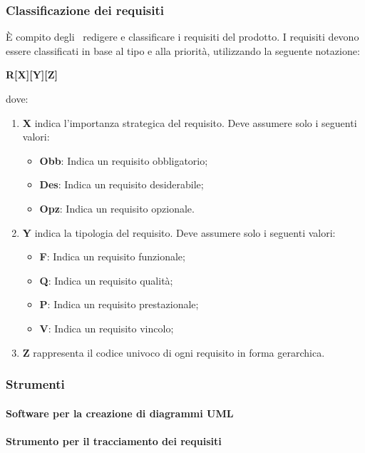 \documentclass[../NormeProgetto.tex]{subfiles}
\begin{document}
		\subsubsection{Classificazione dei requisiti}
		È compito degli \analisti\ redigere e classificare i requisiti del prodotto.  I requisiti devono essere classificati in base al tipo e alla priorità, utilizzando la seguente notazione:
		\begin{center}\textbf{R[X][Y][Z]}\end{center} dove:
			\begin{enumerate}
				\item \textbf{X} indica l'importanza strategica del requisito. Deve assumere solo i seguenti valori:
					\begin{itemize}
						\item \textbf{Obb}: Indica un requisito obbligatorio;
						\item \textbf{Des}: Indica un requisito desiderabile;
						\item \textbf{Opz}: Indica un requisito opzionale.
					\end{itemize}
				\item \textbf{Y} indica la tipologia del requisito. Deve assumere solo i seguenti valori:
					\begin{itemize}
						\item \textbf{F}: Indica un requisito funzionale;
						\item \textbf{Q}: Indica un requisito qualità;
						\item \textbf{P}: Indica un requisito prestazionale;
						\item \textbf{V}: Indica un requisito vincolo;
					\end{itemize}
				\item \textbf{Z} rappresenta il codice univoco di ogni requisito in forma gerarchica.
			\end{enumerate}
		\subsubsection{Strumenti}
			\paragraph{Software per la creazione di diagrammi UML}
			\paragraph{Strumento per il tracciamento dei requisiti}
\end{document}
